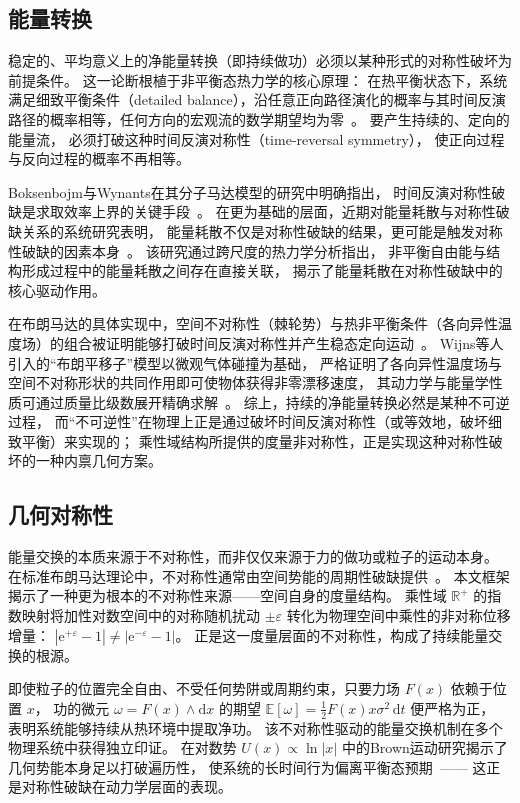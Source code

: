 ﻿\documentclass[10pt,a4paper]{article}
\numberwithin{equation}{section}
\begin{document}
\subsection{能量转换}

稳定的、平均意义上的净能量转换（即持续做功）必须以某种形式的对称性破坏为前提条件。
这一论断根植于非平衡态热力学的核心原理：
在热平衡状态下，系统满足细致平衡条件（detailed balance），沿任意正向路径演化的概率与其时间反演路径的概率相等，任何方向的宏观流的数学期望均为零~\cite{Thibado2023Charging, Baldassarri2025Bridge}。
要产生持续的、定向的能量流，
必须打破这种时间反演对称性（time-reversal symmetry），
使正向过程与反向过程的概率不再相等。

Boksenbojm与Wynants在其分子马达模型的研究中明确指出，
时间反演对称性破缺是求取效率上界的关键手段~\cite{Boksenbojm2009Entropy}。
在更为基础的层面，近期对能量耗散与对称性破缺关系的系统研究表明，
能量耗散不仅是对称性破缺的结果，更可能是触发对称性破缺的因素本身~\cite{Sala2024Thermodynamic}。
该研究通过跨尺度的热力学分析指出，
非平衡自由能与结构形成过程中的能量耗散之间存在直接关联，
揭示了能量耗散在对称性破缺中的核心驱动作用。

在布朗马达的具体实现中，空间不对称性（棘轮势）与热非平衡条件（各向异性温度场）的组合被证明能够打破时间反演对称性并产生稳态定向运动~\cite{Wijns2024Microscopic, Movilla2024Application}。
Wijns等人引入的“布朗平移子”模型以微观气体碰撞为基础，
严格证明了各向异性温度场与空间不对称形状的共同作用即可使物体获得非零漂移速度，
其动力学与能量学性质可通过质量比级数展开精确求解~\cite{Wijns2024Microscopic}。
综上，持续的净能量转换必然是某种不可逆过程，
而“不可逆性”在物理上正是通过破坏时间反演对称性（或等效地，破坏细致平衡）来实现的；
乘性域结构所提供的度量非对称性，正是实现这种对称性破坏的一种内禀几何方案。

\subsection{几何对称性}

能量交换的本质来源于不对称性，而非仅仅来源于力的做功或粒子的运动本身。
在标准布朗马达理论中，不对称性通常由空间势能的周期性破缺提供~\cite{Reimann2002Brownian,Hanggi2009Brownian}。
本文框架揭示了一种更为根本的不对称性来源——空间自身的度量结构。
乘性域 $\mathbb R^+$ 的指数映射将加性对数空间中的对称随机扰动 $\pm\varepsilon$ 转化为物理空间中乘性的非对称位移增量：
$|\mathrm e^{+\varepsilon}-1| \neq |\mathrm e^{-\varepsilon}-1|$。
正是这一度量层面的不对称性，构成了持续能量交换的根源。

即使粒子的位置完全自由、不受任何势阱或周期约束，只要力场 $F(x)$ 依赖于位置 $x$，
功的微元 $\omega = F(x)\wedge\mathrm dx$ 的期望 $\mathbb E[\omega] = \frac12 F(x)x\sigma^2\,\mathrm dt$ 便严格为正，
表明系统能够持续从热环境中提取净功。
该不对称性驱动的能量交换机制在多个物理系统中获得独立印证。
在对数势 $U(x)\propto\ln|x|$ 中的Brown运动研究揭示了几何势能本身足以打破遍历性，
使系统的长时间行为偏离平衡态预期~\cite{Dechant2011Logarithmic, Dechant2012Logarithmic}——
这正是对称性破缺在动力学层面的表现。
\end{document}

